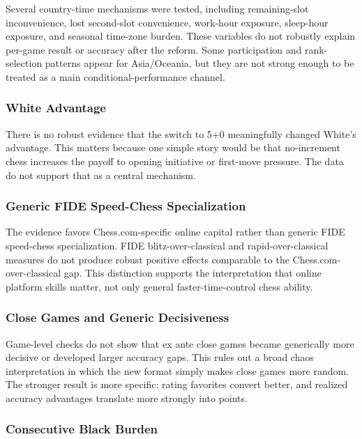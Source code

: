 Several country-time mechanisms were tested, including remaining-slot inconvenience, lost second-slot convenience, work-hour exposure, sleep-hour exposure, and seasonal time-zone burden. These variables do not robustly explain per-game result or accuracy after the reform. Some participation and rank-selection patterns appear for Asia/Oceania, but they are not strong enough to be treated as a main conditional-performance channel.

\subsubsection{White Advantage}

There is no robust evidence that the switch to 5+0 meaningfully changed White's advantage. This matters because one simple story would be that no-increment chess increases the payoff to opening initiative or first-move pressure. The data do not support that as a central mechanism.

\subsubsection{Generic FIDE Speed-Chess Specialization}

The evidence favors Chess.com-specific online capital rather than generic FIDE speed-chess specialization. FIDE blitz-over-classical and rapid-over-classical measures do not produce robust positive effects comparable to the Chess.com-over-classical gap. This distinction supports the interpretation that online platform skills matter, not only general faster-time-control chess ability.

\subsubsection{Close Games and Generic Decisiveness}

Game-level checks do not show that ex ante close games became generically more decisive or developed larger accuracy gaps. This rules out a broad chaos interpretation in which the new format simply makes close games more random. The stronger result is more specific: rating favorites convert better, and realized accuracy advantages translate more strongly into points.

\subsubsection{Consecutive Black Burden}

